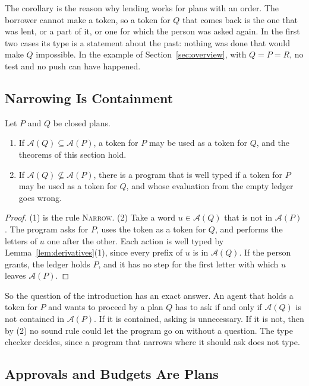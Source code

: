\documentclass[acmsmall,nonacm,screen]{acmart}
\newcommand{\auth}[1]{\mathcal{A}(#1)}
\begin{document}
The corollary is the reason why lending works for plans with an order. The borrower cannot
make a token, so a token for $Q$ that comes back is the one that was lent, or a part of it,
or one for which the person was asked again. In the first two cases its type is a statement
about the past: nothing was done that would make $Q$ impossible. In the example of
Section~\ref{sec:overview}, with $Q = P = R$, no test and no push can have happened.

\subsection{Narrowing Is Containment}

\begin{theorem}[Containment]
\label{thm:containment}
Let $P$ and $Q$ be closed plans.
\begin{enumerate}
\item If $\auth{Q} \subseteq \auth{P}$, a token for $P$ may be used as a token for $Q$, and
  the theorems of this section hold.
\item If $\auth{Q} \not\subseteq \auth{P}$, there is a program that is well typed if a token
  for $P$ may be used as a token for $Q$, and whose evaluation from the empty ledger goes
  wrong.
\end{enumerate}
\end{theorem}

\begin{proof}
(1) is the rule \textsc{Narrow}. (2) Take a word $u \in \auth{Q}$ that is not in $\auth{P}$.
The program asks for $P$, uses the token as a token for $Q$, and performs the letters of $u$
one after the other. Each action is well typed by Lemma~\ref{lem:derivatives}(1), since every
prefix of $u$ is in $\auth{Q}$. If the person grants, the ledger holds $P$, and it has no
step for the first letter with which $u$ leaves $\auth{P}$.
\end{proof}

So the question of the introduction has an exact answer. An agent that holds a token for $P$
and wants to proceed by a plan $Q$ has to ask if and only if $\auth{Q}$ is not contained in
$\auth{P}$. If it is contained, asking is unnecessary. If it is not, then by (2) no sound
rule could let the program go on without a question. The type checker decides, since a
program that narrows where it should ask does not type.

\subsection{Approvals and Budgets Are Plans}
\end{document}
